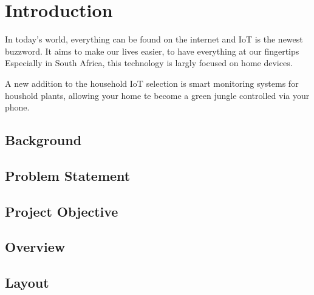 \graphicspath{{introduction/fig/}}

\chapter{Introduction} 
\label{chap:introduction}



In today's world, everything can be found on the internet and IoT is the newest buzzword.
It aims to make our lives easier, to have everything at our fingertips
Especially in South Africa, this technology is largly focused on home devices.

A new addition to the household IoT selection is smart monitoring systems for houshold plants, allowing your home te become a green jungle controlled via your phone.

\section{Background}

\lipsum[2]

\newpage

\section{Problem Statement}

\section{Project Objective}

\section{Overview}

\section{Layout}

